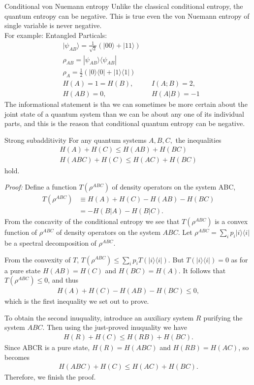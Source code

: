 \begin{subsection}{Conditional von Nuemann entropy}
Unlike the classical conditional entropy, the quantum entropy can be negative. This is true even the von Nuemann entropy of single variable is never negative. \\
For example:
Entangled Particals:
\begin{align*}
& |\psi_{AB} \rangle = \frac{1}{\sqrt{2}}(|00\rangle + |11\rangle) \\
& \rho_{AB}= |\psi_{AB} \rangle \langle \psi_{AB}| \\
& \rho_A=\frac{1}{2}(|0\rangle \langle 0| + |1\rangle \langle 1|) \\
& H(A)=1=H(B), & &I(A;B)=2,  \\
& H(AB)=0, & &H(A|B)=-1 
\end{align*}
The informational statement is tha we can sometimes be more certain about the joint state of a quantum system than we can be about any one of its individual parts, and this is the reason that conditional  quantum entropy can be negative.
\end{subsection}

\begin{subsection}{Strong subadditivity}
For any quantum systems $A, B, C,$ the inequalities
\begin{align*}
H(A)+H(C) \leq H(AB)+H(BC) \\
H(ABC)+H(C) \leq H(AC)+H(BC)
\end{align*}
hold.

\emph{Proof:} Define a function $T(\rho ^{ABC})$ of density operators on the system ABC,
\begin{align*}
T(\rho ^{ABC}) &\equiv H(A)+H(C)-H(AB)-H(BC) \\
&= -H(B|A) -H(B|C) .
\end{align*}
  From the concavity of the conditional entropy we see that $T(\rho ^{ABC})$ is a convex function of $\rho ^{ABC}$ of density operators on the system $ABC$.
Let $\rho ^{ABC} = \sum_ip_i|i \rangle \langle i|$ be a spectral decomposition of $\rho ^{ABC}$.

  From the convexity of $T$, $T(\rho ^{ABC}) \leq \sum_ip_iT(|i \rangle \langle i|)$. But $T(|i \rangle \langle i|)=0$ as for a pure state $H(AB)=H(C)$ and $H(BC)=H(A)$. It follows that $T(\rho ^{ABC}) \leq 0$, and thus
\begin{align*}
H(A)+H(C)-H(AB)-H(BC) \leq 0,
\end{align*}
which is the first inequality we set out to prove.

  To obtain the second inuquality, introduce an auxiliary system $R$ purifying the system $ABC$. Then using the just-proved inuquality we have
\begin{align*}
H(R)+H(C) \leq H(RB)+H(BC).
\end{align*}
  Since ABCR is a pure state, $H(R)=H(ABC)$ and $H(RB)=H(AC)$, so becomes
\begin{align*}
H(ABC)+H(C) \leq H(AC)+H(BC).
\end{align*}
Therefore, we finish the proof.
\end{subsection}